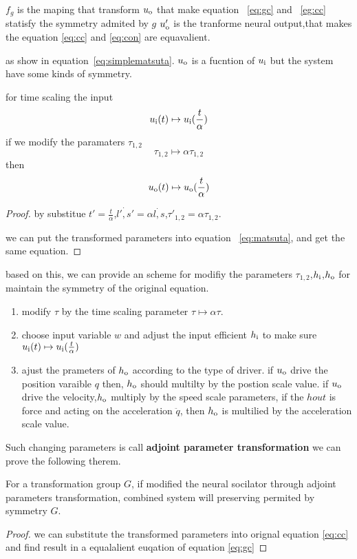 $f_g$ is the maping that transform $u_{\mathrm{o}}$ that make equation ~\ref{eq:gc} and ~\ref{eg:cc} statisfy the symmetry admited by $g$
$u_{\mathrm{o}}'$ is the tranforme neural output,that makes the equation \ref{eq:cc} and \ref{eq:con} are equavalient.
 

as show in equation~\ref{eq:simplematsuta}.
$u_{\mathrm{o}}$ is a fucntion of $u_{\mathrm{i}}$
but the system have some kinds of symmetry.
\begin{mythe}
for time scaling the input
\[
u_{\mathrm{i}}(t) \mapsto u_{\mathrm{i}}(\frac{t}{\alpha})
\]
if we modify the paramaters $\tau_{1,2}$
\[
\tau_{1,2} \mapsto \alpha \tau_{1,2}
\]
then
\[
u_{\mathrm{o}}(t) \mapsto u_{\mathrm{o}}(\frac{t}{\alpha})
\]
\end{mythe}
\begin{proof}

by substitue $t'=\frac{t}{\alpha}$,$\dot{l',s'}=\alpha \dot{l,s}$,$\tau'_{1,2}=\alpha \tau_{1,2}$.


we can put the transformed parameters into equation~ \ref{eq:matsuta}, and get the same equation.

\end{proof}

based on this, we can provide an scheme for modifiy the parameters $\tau_{1,2}$,$h_{\mathrm{i}}$,$h_{\mathrm{o}}$ for maintain the symmetry of the original equation.
\begin{enumerate}
\item modify $\tau$ by the time scaling parameter $\tau \mapsto \alpha \tau$.
\item choose input variable $w$ and adjust the input efficient $h_{\mathrm{i}}$ to make sure $u_{\mathrm{i}}(t) \mapsto u_{\mathrm{i}}(\frac{t}{\alpha})$
\item ajust the prameters of $h_{\mathrm{o}}$ according to the type of driver. if $u_{\mathrm{o}}$ drive the position varaible $q$ then, $h_{\mathrm{o}}$ should multilty by the postion scale value. if $u_{\mathrm{o}}$ drive the velocity,$h_{\mathrm{o}}$ multiply by the speed scale parameters, if the $hout$ is force and acting on the acceleration $\ddot{q}$, then $h_{\mathrm{o}}$ is multilied by the acceleration scale value.
\end{enumerate}
Such changing parameters is call \textbf{adjoint parameter transformation} we can prove the following therem.
\begin{mythe}
For a transformation group $G$, if modified the neural socilator through adjoint parameters transformation, combined system will  preserving permited by symmetry $G$.
\end{mythe}
\begin{proof}
we can substitute the transformed parameters into orignal equation \ref{eq:cc} and find result in a equalalient euqation of equation \ref{eq:gc}
\end{proof}

